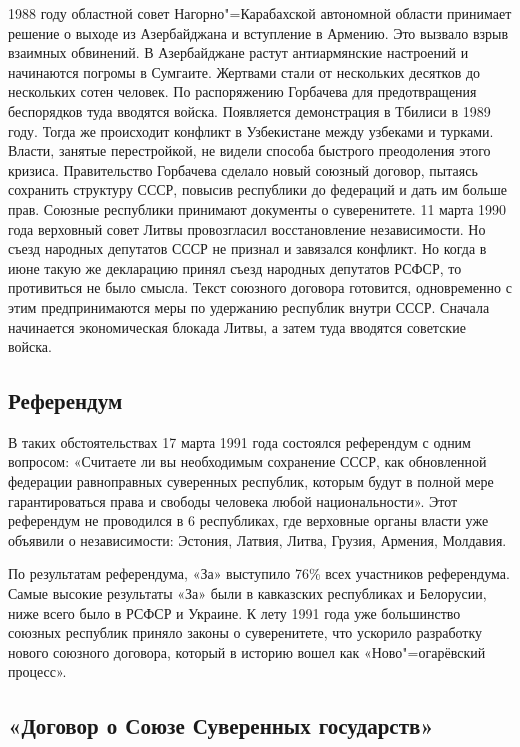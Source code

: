 1988 году областной совет Нагорно"=Карабахской автономной области принимает решение о выходе из Азербайджана и вступление в Армению. Это вызвало взрыв взаимных обвинений. В Азербайджане растут антиармянские настроений и начинаются погромы в Сумгаите. Жертвами стали от нескольких десятков до нескольких сотен человек. По распоряжению Горбачева для предотвращения беспорядков туда вводятся войска. Появляется демонстрация в Тбилиси в 1989 году. Тогда же происходит конфликт в Узбекистане между узбеками и турками. Власти, занятые перестройкой, не видели способа быстрого преодоления этого кризиса. Правительство Горбачева сделало новый союзный договор, пытаясь сохранить структуру СССР, повысив республики до федераций и дать им больше прав. Союзные республики принимают документы о суверенитете. 11 марта 1990 года верховный совет Литвы провозгласил восстановление независимости. Но съезд народных депутатов СССР не признал и завязался конфликт. Но когда в июне такую же декларацию принял съезд народных депутатов РСФСР, то противиться не было смысла. Текст союзного договора готовится, одновременно с этим предпринимаются меры по удержанию республик внутри СССР. Сначала начинается экономическая блокада Литвы, а затем туда вводятся советские войска. 

\subsection{Референдум}

В таких обстоятельствах 17 марта 1991 года состоялся референдум с одним вопросом: «Считаете ли вы необходимым сохранение СССР, как обновленной федерации равноправных суверенных республик, которым будут в полной мере гарантироваться права и свободы человека любой национальности». Этот референдум не проводился в 6 республиках, где верховные органы власти уже объявили о независимости: Эстония, Латвия, Литва, Грузия, Армения, Молдавия. 

По результатам референдума, «За» выступило 76\% всех участников референдума. Самые высокие результаты «За» были в кавказских республиках и Белорусии, ниже всего было в РСФСР и Украине. К лету 1991 года уже большинство союзных республик приняло законы о суверенитете, что ускорило разработку нового союзного договора, который в историю вошел как «Ново"=огарёвский процесс». 

\subsection{«Договор о Союзе Суверенных государств»}

